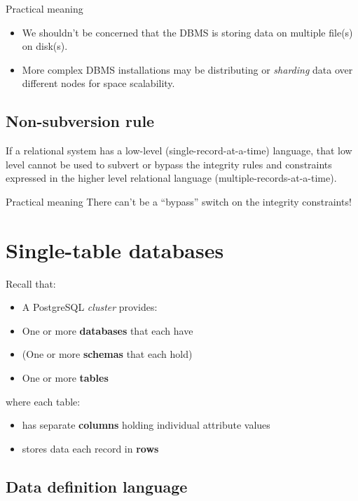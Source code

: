 \documentclass[slides]{pgnotes}
\begin{document}
\begin{greenbox}{Practical meaning}
\begin{itemize}
\item  We shouldn't be concerned that the DBMS is storing data on multiple file(s) on disk(s).
\item  More complex DBMS installations may be distributing or \textit{sharding} data over different nodes for space scalability. 
\end{itemize}
\end{greenbox}


\subsection{Non-subversion rule}
  If a relational system has a low-level (single-record-at-a-time) language, that low level cannot be used to subvert or bypass the integrity rules and constraints expressed in the higher level relational language (multiple-records-at-a-time).

  \begin{greenbox}{Practical meaning}
   There can't be a ``bypass'' switch on the integrity constraints!
  \end{greenbox}

\section{Single-table databases}

Recall that:

\begin{itemize}
\item A PostgreSQL \textit{cluster} provides:
\item One or more \textbf{databases} that each have
\item (One or more \textbf{schemas} that each hold)
\item One or more \textbf{tables}
\end{itemize}

where each table:

\begin{itemize}
\item has separate \textbf{columns} holding individual attribute values
\item stores data each record in \textbf{rows}
\end{itemize}


\subsection{Data definition language}
\end{document}
